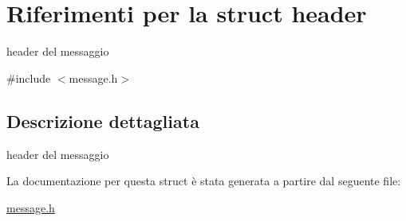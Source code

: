 \hypertarget{structheader}{}\section{Riferimenti per la struct header}
\label{structheader}


header del messaggio  




{\ttfamily \#include $<$message.\+h$>$}



\subsection{Descrizione dettagliata}
header del messaggio 

La documentazione per questa struct è stata generata a partire dal seguente file\+:\begin{DoxyCompactItemize}
\item 
\hyperlink{message_8h}{message.\+h}\end{DoxyCompactItemize}
